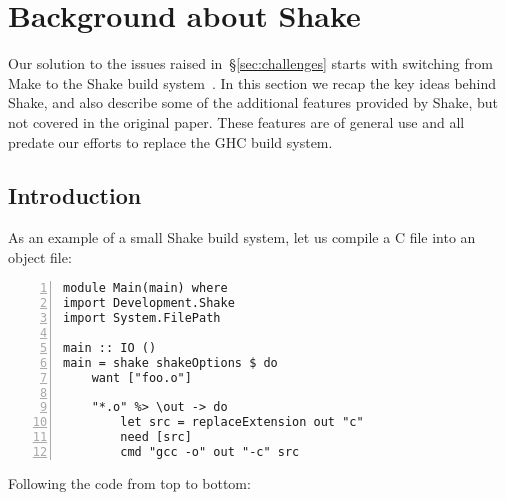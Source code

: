 \section{Background about Shake\label{sec:shake}}

Our solution to the issues raised in~\S\ref{sec:challenges} starts with
switching from Make to the Shake build system~\cite{shake}. In this section we
recap the key ideas behind Shake, and also describe some of the additional
features provided by Shake, but not covered in the original paper. These
features are of general use and all predate our efforts to replace the GHC build
system.

\subsection{Introduction\label{sec:shake_intro}}

As an example of a small Shake build system, let us compile a C file into an object file:

\begin{lstlisting}[numbers=left,xleftmargin=2em,framexleftmargin=1.5em]
module Main(main) where
import Development.Shake
import System.FilePath

main :: IO ()
main = shake shakeOptions $ do
    want ["foo.o"]

    "*.o" %> \out -> do
        let src = replaceExtension out "c"
        need [src]
        cmd "gcc -o" out "-c" src
\end{lstlisting}

\noindent Following the code from top to bottom:

